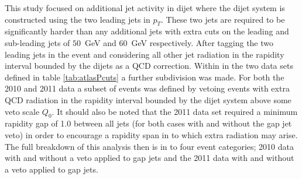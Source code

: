 	This study focused on additional jet activity in dijet where the dijet system
	is constructed using the two leading jets in $p_T$.  These two jets are required
	to be significantly harder than any additional jets with extra cuts on the leading
	and sub-leading jets of $50$~GeV and $60$~GeV respectively.  After tagging the two
	leading jets in the event and considering all other jet radiation in the rapidity
	interval bounded by the dijets as a QCD correction.  Within in the two data sets
	defined in table \eqref{tab:atlasPcuts} a further subdivision was made.  For both the
	2010 and 2011 data a subset of events was defined by vetoing events with extra
	QCD radiation in the rapidity interval bounded by the dijet system above some veto
	scale $Q_0$.  It should also be noted that the 2011 data set required a minimum
	rapidity gap of 1.0 between all jets (for both cases with and without the gap jet
	veto) in order to encourage a rapidity span in to which extra radiation may arise.
	The full breakdown of this analysis then is in to four event categories;
	2010 data with and without a veto applied to gap jets and the 2011 data with and
	without a veto applied to gap jets.

